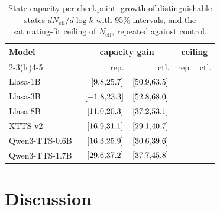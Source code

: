 \documentclass{article}
\newcommand{\tabsize}{\small}
\begin{document}
\begin{table}[t]
\centering
\caption{State capacity per checkpoint: growth of distinguishable states
$dN_{\mathrm{eff}}/d\log k$ with 95\% intervals, and the saturating-fit
ceiling of $N_{\mathrm{eff}}$, repeated against control.}
\label{tab:cap}
{\tabsize\setlength{\tabcolsep}{1.4pt}
\begin{tabular}{lrrrr}
\toprule
Model & \multicolumn{2}{c}{capacity gain} & \multicolumn{2}{c}{ceiling} \\
\cmidrule(lr){2-3}\cmidrule(lr){4-5}
 & rep. & ctl. & rep. & ctl. \\
\midrule
Llasa-1B~\cite{ye2025llasa} & \GainRepLlasaOneB{} $[9.8{}{,}25.7{}]$ & \GainCtlLlasaOneB{} $[50.9{}{,}63.5{}]$ & \SatRepLlasaOneB{} & \SatCtlLlasaOneB{} \\
Llasa-3B~\cite{ye2025llasa} & \GainRepLlasaThreeB{} $[-1.8{}{,}23.3{}]$ & \GainCtlLlasaThreeB{} $[52.8{}{,}68.0{}]$ & \SatRepLlasaThreeB{} & \SatCtlLlasaThreeB{} \\
Llasa-8B~\cite{ye2025llasa} & \GainRepLlasaEightB{} $[11.0{}{,}20.3{}]$ & \GainCtlLlasaEightB{} $[37.2{}{,}53.1{}]$ & \SatRepLlasaEightB{} & \SatCtlLlasaEightB{} \\
XTTS-v2~\cite{casanova2024xtts} & \GainRepXttsTwo{} $[16.9{}{,}31.1{}]$ & \GainCtlXttsTwo{} $[29.1{}{,}40.7{}]$ & \SatRepXttsTwo{} & \SatCtlXttsTwo{} \\
Qwen3-TTS-0.6B~\cite{hu2026qwen3tts} & \GainRepQwenZeroSixB{} $[16.3{}{,}25.9{}]$ & \GainCtlQwenZeroSixB{} $[30.6{}{,}39.6{}]$ & \SatRepQwenZeroSixB{} & \SatCtlQwenZeroSixB{} \\
Qwen3-TTS-1.7B~\cite{hu2026qwen3tts} & \GainRepQwenOneSevenB{} $[29.6{}{,}37.2{}]$ & \GainCtlQwenOneSevenB{} $[37.7{}{,}45.8{}]$ & \SatRepQwenOneSevenB{} & \SatCtlQwenOneSevenB{} \\
\bottomrule
\end{tabular}}
\end{table}

\section{Discussion}
\label{sec:discussion}
\end{document}
